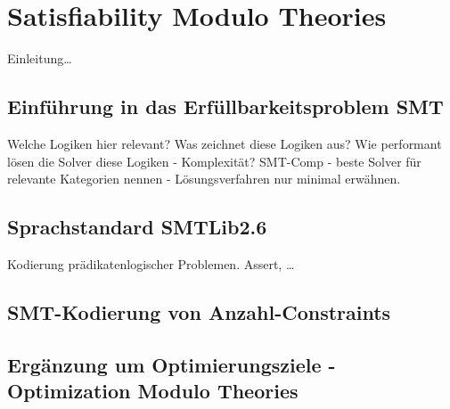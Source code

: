 \chapter{Satisfiability Modulo Theories}
Einleitung\ldots

\section{Einführung in das Erfüllbarkeitsproblem SMT}
Welche Logiken hier relevant?
Was zeichnet diese Logiken aus?
Wie performant lösen die Solver diese Logiken - Komplexität?
SMT-Comp - beste Solver für relevante Kategorien nennen - Lösungsverfahren nur minimal erwähnen.

\section{Sprachstandard SMTLib2.6}
Kodierung prädikatenlogischer Problemen.
Assert, \ldots

\section{SMT-Kodierung von Anzahl-Constraints}

\section{Ergänzung um Optimierungsziele - Optimization Modulo Theories}
